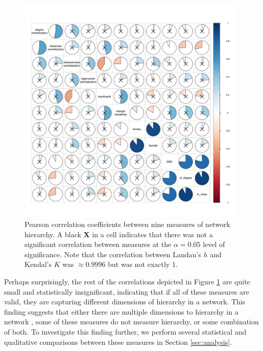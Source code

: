 \documentclass[3p,times]{elsarticle}
\begin{document}
\begin{figure}
\begin{center}
	\caption{\label{fig:measure correlations} Pearson correlation coefficients between nine measures of network hierarchy. A black \textbf{X} in a cell indicates that there was not a significant correlation between measures at the $\alpha = 0.05$ level of significance. Note that the correlation between Landau's $h$ and Kendal's $K$ was $\approx 0.9996$ but was not exactly 1.}
		\includegraphics[width = 0.98\textwidth]{./images/Global_Measure_Correlations_with_Tests.pdf}
\end{center}
\end{figure}

Perhaps surprisingly, the rest of the correlations depicted in Figure \ref{fig:measure correlations} are quite small and statistically insignificant, indicating that if all of these measures are valid, they are capturing different dimensions of hierarchy in a network. This finding suggests that either there are multiple dimensions to hierarchy in a network \cite{Corominas-Murtra2013}, some of these measures do not measure hierarchy, or some combination of both. To investigate this finding further, we perform several statistical and qualitative comparisons between these measures in Section \ref{sec:analysis}.
\end{document}

